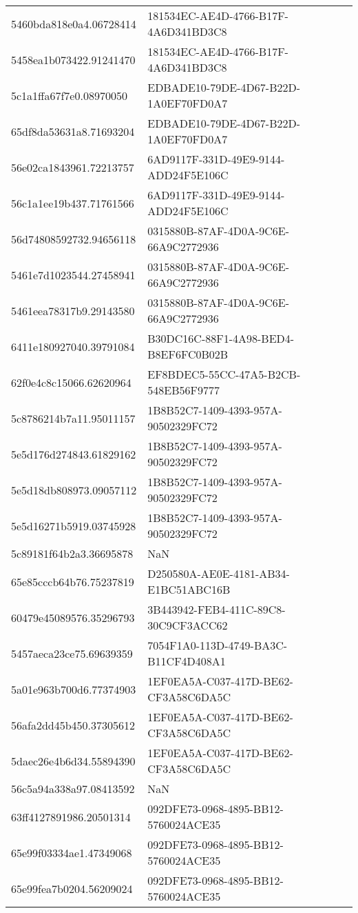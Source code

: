 \begin{tabular}{ll}
5460bda818e0a4.06728414 & 181534EC-AE4D-4766-B17F-4A6D341BD3C8 \\
5458ea1b073422.91241470 & 181534EC-AE4D-4766-B17F-4A6D341BD3C8 \\
5c1a1ffa67f7e0.08970050 & EDBADE10-79DE-4D67-B22D-1A0EF70FD0A7 \\
65df8da53631a8.71693204 & EDBADE10-79DE-4D67-B22D-1A0EF70FD0A7 \\
56e02ca1843961.72213757 & 6AD9117F-331D-49E9-9144-ADD24F5E106C \\
56c1a1ee19b437.71761566 & 6AD9117F-331D-49E9-9144-ADD24F5E106C \\
56d74808592732.94656118 & 0315880B-87AF-4D0A-9C6E-66A9C2772936 \\
5461e7d1023544.27458941 & 0315880B-87AF-4D0A-9C6E-66A9C2772936 \\
5461eea78317b9.29143580 & 0315880B-87AF-4D0A-9C6E-66A9C2772936 \\
6411e180927040.39791084 & B30DC16C-88F1-4A98-BED4-B8EF6FC0B02B \\
62f0e4c8c15066.62620964 & EF8BDEC5-55CC-47A5-B2CB-548EB56F9777 \\
5c8786214b7a11.95011157 & 1B8B52C7-1409-4393-957A-90502329FC72 \\
5e5d176d274843.61829162 & 1B8B52C7-1409-4393-957A-90502329FC72 \\
5e5d18db808973.09057112 & 1B8B52C7-1409-4393-957A-90502329FC72 \\
5e5d16271b5919.03745928 & 1B8B52C7-1409-4393-957A-90502329FC72 \\
5c89181f64b2a3.36695878 & NaN \\
65e85cccb64b76.75237819 & D250580A-AE0E-4181-AB34-E1BC51ABC16B \\
60479e45089576.35296793 & 3B443942-FEB4-411C-89C8-30C9CF3ACC62 \\
5457aeca23ce75.69639359 & 7054F1A0-113D-4749-BA3C-B11CF4D408A1 \\
5a01e963b700d6.77374903 & 1EF0EA5A-C037-417D-BE62-CF3A58C6DA5C \\
56afa2dd45b450.37305612 & 1EF0EA5A-C037-417D-BE62-CF3A58C6DA5C \\
5daec26e4b6d34.55894390 & 1EF0EA5A-C037-417D-BE62-CF3A58C6DA5C \\
56c5a94a338a97.08413592 & NaN \\
63ff4127891986.20501314 & 092DFE73-0968-4895-BB12-5760024ACE35 \\
65e99f03334ae1.47349068 & 092DFE73-0968-4895-BB12-5760024ACE35 \\
65e99fea7b0204.56209024 & 092DFE73-0968-4895-BB12-5760024ACE35 \\

\end{tabular}
